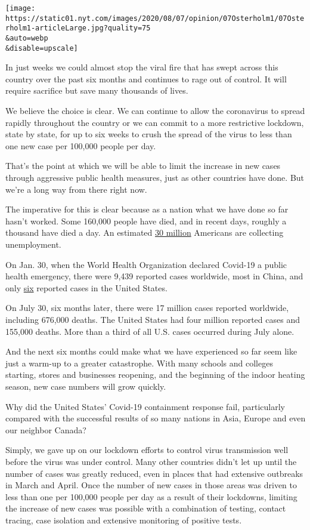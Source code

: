 \texttt{[image: https://static01.nyt.com/images/2020/08/07/opinion/07Osterholm1/07Osterholm1-articleLarge.jpg?quality=75\\\&auto=webp\\\&disable=upscale]}

In just weeks we could almost stop the viral fire that has swept across
this country over the past six months and continues to rage out of
control. It will require sacrifice but save many thousands of lives.

We believe the choice is clear. We can continue to allow the coronavirus
to spread rapidly throughout the country or we can commit to a more
restrictive lockdown, state by state, for up to six weeks to crush the
spread of the virus to less than one new case per 100,000 people per
day.

That's the point at which we will be able to limit the increase in new
cases through aggressive public health measures, just as other countries
have done. But we're a long way from there right now.

The imperative for this is clear because as a nation what we have done
so far hasn't worked. Some 160,000 people have died, and in recent days,
roughly a thousand have died a day. An estimated
\href{https://www.nytimes.com/2020/08/06/business/economy/unemployment-claims.html}{30
million} Americans are collecting unemployment.

On Jan. 30, when the World Health Organization declared Covid-19 a
public health emergency, there were 9,439 reported cases worldwide, most
in China, and only
\href{https://www.cnn.com/asia/live-news/coronavirus-outbreak-01-30-20-intl-hnk/h_4263dd94af73bd404b425b133637a0e7}{six}
reported cases in the United States.

On July 30, six months later, there were 17 million cases reported
worldwide, including 676,000 deaths. The United States had four million
reported cases and 155,000 deaths. More than a third of all U.S. cases
occurred during July alone.

And the next six months could make what we have experienced so far seem
like just a warm-up to a greater catastrophe. With many schools and
colleges starting, stores and businesses reopening, and the beginning of
the indoor heating season, new case numbers will grow quickly.

Why did the United States' Covid-19 containment response fail,
particularly compared with the successful results of so many nations in
Asia, Europe and even our neighbor Canada?

Simply, we gave up on our lockdown efforts to control virus transmission
well before the virus was under control. Many other countries didn't let
up until the number of cases was greatly reduced, even in places that
had extensive outbreaks in March and April. Once the number of new cases
in those areas was driven to less than one per 100,000 people per day as
a result of their lockdowns, limiting the increase of new cases was
possible with a combination of testing, contact tracing, case isolation
and extensive monitoring of positive tests.

